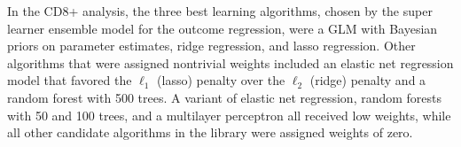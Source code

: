 
In the CD8+ analysis, the three best learning algorithms, chosen by the super
learner ensemble model for the outcome regression, were a GLM with Bayesian
priors on parameter estimates, ridge regression, and lasso regression. Other
algorithms that were assigned nontrivial weights included an elastic net
regression model that favored the $\ell_1$ (lasso) penalty over the $\ell_2$
(ridge) penalty and a random forest with 500 trees. A variant of elastic net
regression, random forests with 50 and 100 trees, and a multilayer perceptron
all received low weights, while all other candidate algorithms in the library
were assigned weights of zero.
